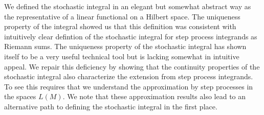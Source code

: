 We defined the stochastic integral in an elegant but somewhat abstract way as the representative of a linear functional on a Hilbert space.  The uniqueness property of the integral showed us that this definition was consistent with intuitively clear defintion of the stochastic integral for step process integrands as Riemann sums.  The uniqueness property of the stochastic integral has shown itself to be a very useful technical tool but is lacking somewhat in intuitive appeal.  We repair this deficiency by showing that the continuity properties of the stochastic integral also characterize the extension from step process integrands.  To see this requires that we understand the approximation by step processes in the spaces $L(M)$.  We note that these approximation results also lead to an alternative path to defining the stochastic integral in the first place.  

